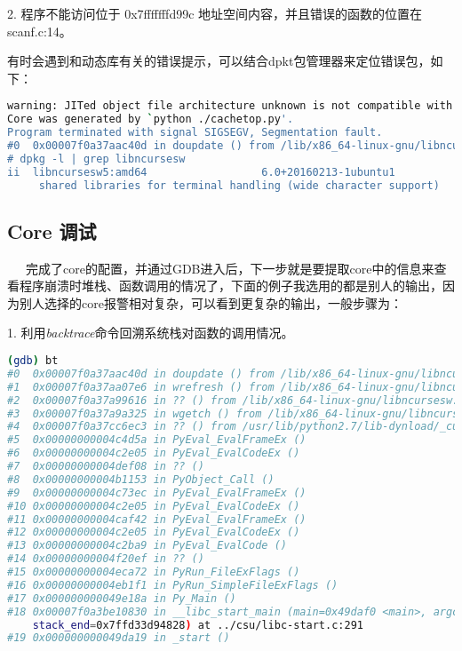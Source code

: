 \documentclass[12pt]{article}  %
\begin{document}
2. 程序不能访问位于 0x7fffffffd99c 地址空间内容，并且错误的函数的位置在 scanf.c:14。\par
有时会遇到和动态库有关的错误提示，可以结合dpkt包管理器来定位错误包，如下：
\begin{lstlisting}[language=sh]
warning: JITed object file architecture unknown is not compatible with target architecture i386:x86-64.
Core was generated by `python ./cachetop.py'.
Program terminated with signal SIGSEGV, Segmentation fault.
#0  0x00007f0a37aac40d in doupdate () from /lib/x86_64-linux-gnu/libncursesw.so.5
# dpkg -l | grep libncursesw
ii  libncursesw5:amd64                  6.0+20160213-1ubuntu1                    amd64
     shared libraries for terminal handling (wide character support)
\end{lstlisting}
\subsection{Core 调试}
\ \ \ 完成了core的配置，并通过GDB进入后，下一步就是要提取core中的信息来查看程序崩溃时堆栈、函数调用的情况了，下面的例子我选用的都是别人的输出，因为别人选择的core报警相对复杂，可以看到更复杂的输出，一般步骤为：\par
1. 利用\emph{backtrace}命令回溯系统栈对函数的调用情况。\par
\begin{lstlisting}[language=sh]
(gdb) bt
#0  0x00007f0a37aac40d in doupdate () from /lib/x86_64-linux-gnu/libncursesw.so.5
#1  0x00007f0a37aa07e6 in wrefresh () from /lib/x86_64-linux-gnu/libncursesw.so.5
#2  0x00007f0a37a99616 in ?? () from /lib/x86_64-linux-gnu/libncursesw.so.5
#3  0x00007f0a37a9a325 in wgetch () from /lib/x86_64-linux-gnu/libncursesw.so.5
#4  0x00007f0a37cc6ec3 in ?? () from /usr/lib/python2.7/lib-dynload/_curses.x86_64-linux-gnu.so
#5  0x00000000004c4d5a in PyEval_EvalFrameEx ()
#6  0x00000000004c2e05 in PyEval_EvalCodeEx ()
#7  0x00000000004def08 in ?? ()
#8  0x00000000004b1153 in PyObject_Call ()
#9  0x00000000004c73ec in PyEval_EvalFrameEx ()
#10 0x00000000004c2e05 in PyEval_EvalCodeEx ()
#11 0x00000000004caf42 in PyEval_EvalFrameEx ()
#12 0x00000000004c2e05 in PyEval_EvalCodeEx ()
#13 0x00000000004c2ba9 in PyEval_EvalCode ()
#14 0x00000000004f20ef in ?? ()
#15 0x00000000004eca72 in PyRun_FileExFlags ()
#16 0x00000000004eb1f1 in PyRun_SimpleFileExFlags ()
#17 0x000000000049e18a in Py_Main ()
#18 0x00007f0a3be10830 in __libc_start_main (main=0x49daf0 <main>, argc=2, argv=0x7ffd33d94838, init=<optimized out>, fini=<optimized out>, rtld_fini=<optimized out>, 
    stack_end=0x7ffd33d94828) at ../csu/libc-start.c:291
#19 0x000000000049da19 in _start ()
\end{lstlisting}\par
\end{document}

